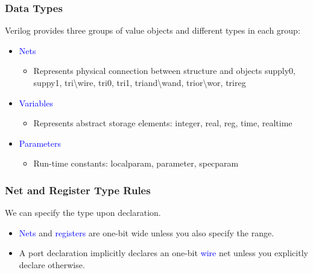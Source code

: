 \documentclass[t, notes, xcolor=table]{beamer}
\begin{document}
\begin{frame}
\frametitle{Data Types}

Verilog provides three groups of value objects and different types in each group:
\begin{itemize}
\item \textcolor{blue}{Nets}
\begin{itemize}
	\item Represents physical connection between structure and objects supply0, suppy1, tri\textbackslash wire, tri0, tri1, triand\textbackslash wand, trior\textbackslash wor, trireg
\end{itemize}
\item \textcolor{blue}{Variables}
\begin{itemize}
	\item Represents abstract storage elements: integer, real, reg, time, realtime 
\end{itemize}
\item \textcolor{blue}{Parameters}
\begin{itemize}
	\item Run-time constants: localparam, parameter, specparam
\end{itemize}
\end{itemize}
\end{frame}


\begin{frame}
\frametitle{Net and Register Type Rules}

We can specify the type upon declaration.
\begin{itemize}
\item \textcolor{blue}{Nets} and \textcolor{blue}{registers} are one-bit wide unless you also specify the range.
\item A port declaration implicitly declares an one-bit \textcolor{blue}{wire} net unless you explicitly declare otherwise.
\end{itemize}

\end{frame}
\end{document}
